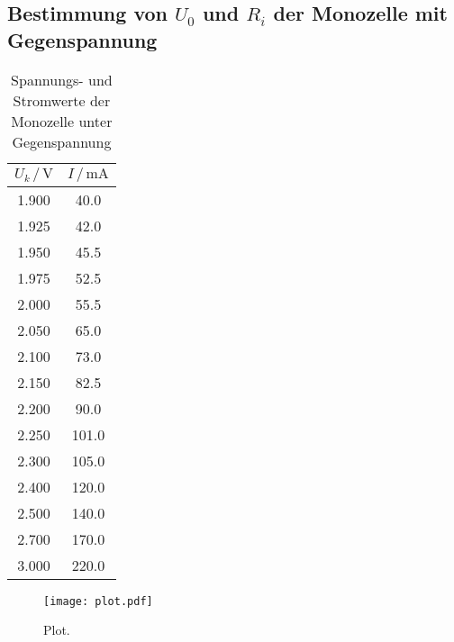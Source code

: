 \subsection{Bestimmung von $U_0$ und $R_i$ der Monozelle 
            mit Gegenspannung}
\begin{table}
  \centering
  \caption{Spannungs- und Stromwerte der Monozelle unter 
           Gegenspannung}
  \label{tab:Gegen}
  \begin{tabular}{c c}
    \toprule
     $U_k \,/\, \si{\volt}$ & $I \,/\, \si{\milli\ampere}$\\
    \midrule
      1.900 &  40.0\\
      1.925 &  42.0\\
      1.950 &  45.5\\
      1.975 &  52.5\\
      2.000 &  55.5\\
      2.050 &  65.0\\
      2.100 &  73.0\\
      2.150 &  82.5\\
      2.200 &  90.0\\
      2.250 & 101.0\\
      2.300 & 105.0\\
      2.400 & 120.0\\
      2.500 & 140.0\\
      2.700 & 170.0\\
      3.000 & 220.0\\
    \bottomrule
  \end{tabular}
\end{table}


\begin{figure}
  \centering
  \texttt{[image: plot.pdf]}
  \caption{Plot.}
  \label{fig:plot}
\end{figure}


